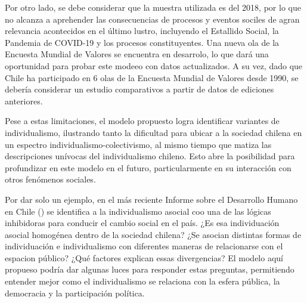 \documentclass[
  12pt,
  letterpaper,
  DIV=11,
  numbers=noendperiod]{scrartcl}
\begin{document}
Por otro lado, se debe considerar que la muestra utilizada es del 2018,
por lo que no alcanza a aprehender las consecuencias de procesos y
eventos sociles de agran relevancia acontecidos en el último lustro,
incluyendo el Estallido Social, la Pandemia de COVID-19 y los procesos
constituyentes. Una nueva ola de la Encuesta Mundial de Valores se
encuentra en desarrolo, lo que dará una oportunidad para probar este
modeeo con datos actualizados. A su vez, dado que Chile ha participado
en 6 olas de la Encuesta Mundial de Valores desde 1990, se debería
considerar un estudio comparativos a partir de datos de ediciones
anteriores.

Pese a estas limitaciones, el modelo propuesto logra identificar
variantes de individualismo, ilustrando tanto la dificultad para ubicar
a la sociedad chilena en un espectro individualismo-colectivismo, al
mismo tiempo que matiza las descripciones unívocas del individualismo
chileno. Esto abre la posibilidad para profundizar en este modelo en el
futuro, particularmente en su interacción con otros fenómenos sociales.

Por dar solo un ejemplo, en el más reciente Informe sobre el Desarrollo
Humano en Chile () se identifica a la
individualismo asocial coo una de las lógicas inhibidoras para conducir
el cambio social en el país. ¿Es esa individuación asocial homogénea
dentro de la sociedad chilena? ¿Se asocian distintas formas de
individuación e individualismo con diferentes maneras de relacionarse
con el espacion público? ¿Qué factores explican essas divergencias? El
modelo aquí propueso podría dar algunas luces para responder estas
preguntas, permitiendo entender mejor como el individualismo se
relaciona con la esfera pública, la democracia y la participación
política.
\end{document}
